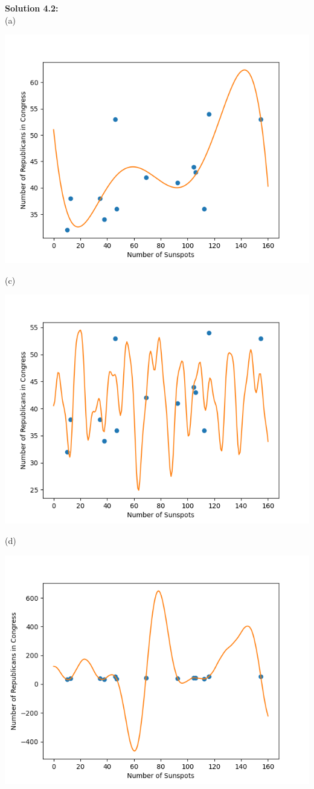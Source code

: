 \documentclass[submit]{harvardml}
\begin{document}
\bigskip
\noindent\textbf{Solution 4.2:}\\
(a)
\begin{center}
    \includegraphics[scale=0.5]{4.2a.png}
\end{center}
(c)
\begin{center}
    \includegraphics[scale=0.5]{4.2c.png}
\end{center}
(d)
\begin{center}
    \includegraphics[scale=0.5]{4.2d.png}
\end{center}
\end{document}
